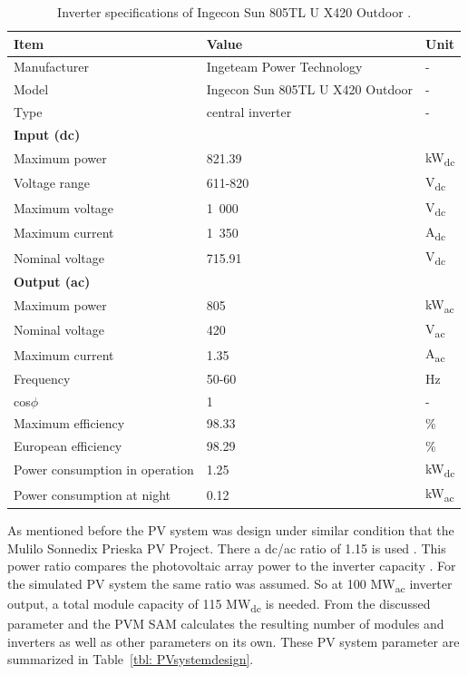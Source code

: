 \documentclass[Master,MEE,english]{twbook}%
\begin{document}
\begin{table}[htbp]  
  \centering
	\begin{tabular}{ p{6.0cm}  C{7.0cm}  C{1.5cm} } 
	\hline	
\textbf{Item} & \textbf{Value} & \textbf{Unit} \\ \hline \hline
Manufacturer  & Ingeteam Power Technology & - \\ 
Model & Ingecon Sun 805TL U X420 Outdoor & - \\ 
Type &  central inverter & - \\ \hline
\textbf{Input (dc)} &  &  \\ 
Maximum power & 821.39 & kW\textsubscript{dc} \\ 
Voltage range & 611-820 & V\textsubscript{dc} \\ 
Maximum voltage & 1~000 & V\textsubscript{dc} \\ 
Maximum current & 1~350 & A\textsubscript{dc} \\
Nominal voltage & 715.91 & V\textsubscript{dc} \\ \hline
\textbf{Output (ac)} &  &  \\ 
Maximum power & 805 & kW\textsubscript{ac} \\ 
Nominal voltage & 420 & V\textsubscript{ac} \\
Maximum current & 1.35 & A\textsubscript{ac} \\
Frequency & 50-60 & Hz\\
cos$\phi$ & 1 & -\\ \hline
Maximum efficiency & 98.33 & \% \\
European efficiency & 98.29 & \% \\
Power consumption in operation &1.25 & kW\textsubscript{dc} \\ 
Power consumption at night & 0.12 & kW\textsubscript{ac} \\ 
\hline
\end{tabular}
\caption[Inverter specifications of Ingecon Sun 805TL U X420 Outdoor.]{Inverter specifications of Ingecon Sun 805TL U X420 Outdoor \cite{IngeteamINC.2015,NREL2015g}.}\label{tbl: PVinverter}
\end{table}
\newpage\noindent
As mentioned before the PV system was design under similar condition that the Mulilo Sonnedix Prieska PV Project. There a dc/ac ratio of 1.15 is used \cite{Morse2014}. This power ratio compares the photovoltaic array power to the inverter capacity \cite{Woodcock2013}. For the simulated PV system the same ratio was assumed. So at 100 MW\textsubscript{ac} inverter output, a total module capacity of 115 MW\textsubscript{dc} is needed. From the discussed parameter and the PVM SAM calculates the resulting number of modules and inverters as well as other parameters on its own. These PV system parameter are summarized in Table~\ref{tbl: PVsystemdesign}. \\ \noindent
\end{document}
